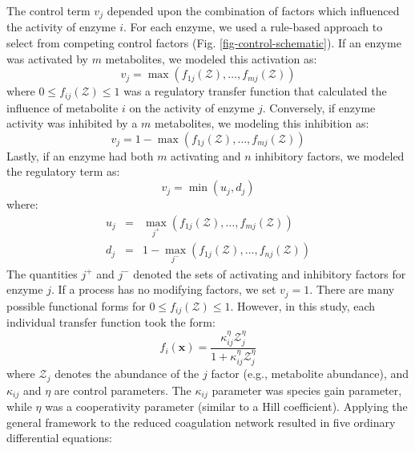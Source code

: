 \documentclass[12pt]{article}
\begin{document}
The control term $v_{j}$ depended upon the combination of factors which influenced the activity of enzyme $i$.
For each enzyme, we used a rule-based approach to select from competing control factors (Fig. \ref{fig-control-schematic}). 
If an enzyme was activated by $m$ metabolites, we modeled this activation as:
\begin{equation}
	v_{j} = \max\left(f_{1j}\left(\mathcal{Z}\right),\hdots,f_{mj}\left(\mathcal{Z}\right)\right)
\end{equation}where $0\leq f_{ij}\left(\mathcal{Z}\right)\leq 1$ was a regulatory transfer function that calculated the influence of metabolite $i$ on the activity of enzyme $j$. 
Conversely, if enzyme activity was inhibited by a $m$ metabolites, we modeling this inhibition as:
\begin{equation}
	v_{j} = 1 - \max\left(f_{1j}\left(\mathcal{Z}\right),\hdots,f_{mj}\left(\mathcal{Z}\right)\right)
\end{equation}Lastly, if an enzyme had both $m$ activating and $n$ inhibitory factors, we modeled the regulatory term as:
\begin{equation}
	v_{j} = \min\left(u_{j},d_{j}\right)
\end{equation}where:
\begin{eqnarray}
	u_{j} &=& \max_{j^{+}}\left(f_{1j}\left(\mathcal{Z}\right),\hdots,f_{mj}\left(\mathcal{Z}\right)\right) \\
	d_{j} &=& 1 - \max_{j^{-}}\left(f_{1j}\left(\mathcal{Z}\right),\hdots,f_{nj}\left(\mathcal{Z}\right)\right)
\end{eqnarray}
The quantities $j^{+}$ and $j^{-}$ denoted the sets of activating and inhibitory factors for enzyme $j$. 
If a process has no modifying factors, we set $v_{j} = 1$.
There are many possible functional forms for $0\leq f_{ij}\left(\mathcal{Z}\right)\leq 1$. 
However, in this study, each individual transfer function took the form:
\begin{equation}\label{eqn:control-factor}
	f_{i}\left(\mathbf{x}\right) = \frac{\kappa_{ij}^{\eta}\mathcal{Z}_{j}^{\eta}}{1 + \kappa_{ij}^{\eta}\mathcal{Z}_{j}^{\eta}}
\end{equation}where $\mathcal{Z}_{j}$ denotes the abundance of the $j$ factor (e.g., metabolite abundance), and $\kappa_{ij}$ and $\eta$ are control parameters. 
The $\kappa_{ij}$ parameter was species gain parameter, while $\eta$ was a cooperativity parameter (similar to a Hill coefficient).
Applying the general framework to the reduced coagulation network resulted in five ordinary differential equations:
\end{document}

